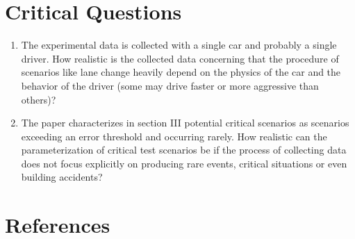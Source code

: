 \documentclass[oneside, notitlepage, twocolumn]{scrartcl}
\begin{document}
\section{Critical Questions}
\begin{enumerate}
    \item The experimental data is collected with a single car and probably a single driver.
        How realistic is the collected data concerning that the procedure of scenarios like lane change heavily depend on the physics of the car and the behavior of the driver (some may drive faster or more aggressive than others)?
    \item The paper characterizes in section III potential critical scenarios as scenarios exceeding an error threshold and occurring rarely.
        How realistic can the parameterization of critical test scenarios be if the process of collecting data does not focus explicitly on producing rare events, critical situations or even building accidents?
\end{enumerate}

\section{References}
\begingroup
\renewcommand{\section}[2]{}%
\nocite{*}
\printbibliography%
\endgroup
\end{document}
